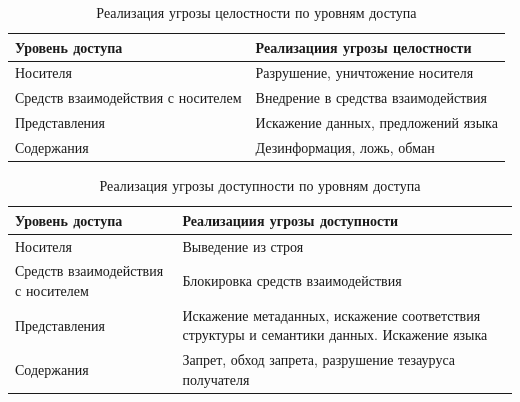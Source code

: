 \begin{table}[ht]
    \caption{Реализация угрозы целостности по уровням доступа}
    \label{t:integrThreatByLevels}
    \centering
    \begin{tabular}[c]{|p{}|p{}|}
        \hline\hline
        Уровень доступа & Реализациия угрозы целостности\\ \hline\hline
        Носителя & Разрушение, уничтожение носителя\\ \hline
        Средств взаимодействия с носителем & Внедрение в средства взаимодействия\\ \hline
        Представления & Искажение данных, предложений языка\\ \hline
        Содержания & Дезинформация, ложь, обман\\ \hline
    \end{tabular}
\end{table}

\begin{table}[ht]
    \caption{Реализация угрозы доступности по уровням доступа}
    \label{t:accessThreatByLevels}
    \centering
    \begin{tabular}[c]{|p{}|p{}|}
        \hline\hline
        Уровень доступа &
            Реализациия угрозы доступности\\ \hline\hline
        Носителя & 
            Выведение из строя\\ \hline
        Средств взаимодействия с носителем & 
            Блокировка средств взаимодействия\\ \hline
        Представления & 
            Искажение метаданных, искажение соответствия структуры и 
            семантики данных. Искажение языка\\ \hline
        Содержания & 
            Запрет, обход запрета, разрушение тезауруса получателя\\ \hline
    \end{tabular}
\end{table}


